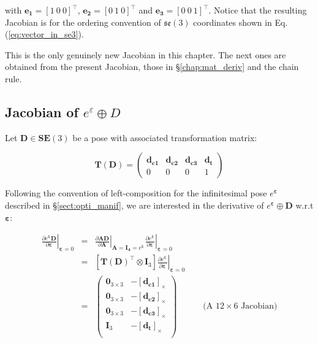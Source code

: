 \documentclass[a4paper,11pt]{report}
\newcommand{\E}{{\bm{\varepsilon}}}
\begin{document}
\noindent with $\mathbf{e_1}=[1 ~ 0 ~ 0]^\top$, 
$\mathbf{e_2}=[0 ~ 1 ~ 0]^\top$ and 
$\mathbf{e_3}=[0 ~ 0 ~ 1]^\top$. 
Notice that the resulting Jacobian is for the 
ordering convention of $\mathfrak{se}(3)$ coordinates shown in Eq.(\ref{eq:vector_in_se3}).

This is the only genuinely new Jacobian in this chapter. 
The next ones are obtained from the present Jacobian, 
those in \S\ref{chap:mat_deriv} and the chain rule.


\subsection{Jacobian of $e^\varepsilon \oplus D$}
\label{sect:jacob_eD}

Let $\mathbf{D} \in \mathbf{SE}(3)$ be a pose with associated transformation matrix:

\begin{equation}
\mathbf{T}(\mathbf{D}) = 
\left(
\begin{array}{ccc|c}
 \mathbf{d_{c1}}  & \mathbf{d_{c2}}  & \mathbf{d_{c3}}  & \mathbf{d_{t}}  \\
\hline
  0 & 0 & 0 & 1
\end{array}
\right) 
\end{equation}

Following the convention of left-composition for the infinitesimal 
pose $e^\E$ described in \S\ref{sect:opti_manif},
we are interested in the derivative of $e^\E \oplus \mathbf{D}$ w.r.t $\E$:

\begin{eqnarray}
\left. \frac{\partial e^\E \mathbf{D}}{\partial \E} \right|_{\E = 0}
&=& 
\left. \frac{\partial \mathbf{A} \mathbf{D}}{\partial \mathbf{A} } \right|_{\mathbf{A}=\mathbf{I_4} = e^\E}
\left. \frac{\partial e^\E}{\partial \E} \right|_{\E=0}
\\
&=& 
\left[ \mathbf{T}(\mathbf{D})^\top \otimes  \mathbf{I}_3 \right] 
\left. \frac{\partial e^\E}{\partial \E} \right|_{\E=0}
\\
&=& 
\left(
\begin{array}{cc}
 \mathbf{0}_{3\times 3}  & -[\mathbf{d_{c1}}]_\times \\
 \mathbf{0}_{3\times 3}  & -[\mathbf{d_{c2}}]_\times \\
 \mathbf{0}_{3\times 3}  & -[\mathbf{d_{c3}}]_\times \\
 \mathbf{I}_{3}  & -[\mathbf{d_{t}}]_\times \\
\end{array}
\right)
\quad\quad\quad \text{(A $12 \times 6$ Jacobian)}
\end{eqnarray}
\end{document}
